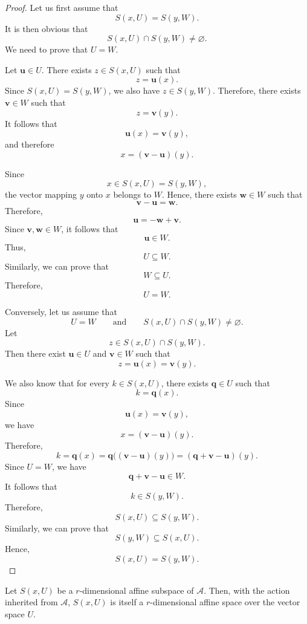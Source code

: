 \documentclass[12pt]{article}
\begin{document}
\begin{proof}
Let us first assume that
\[
S(x,U)=S(y,W).
\]
It is then obvious that
\[
S(x,U)\cap S(y,W)\neq\varnothing.
\]
We need to prove that \(U=W\).

Let \(\mathbf{u}\in U\). There exists \(z\in S(x,U)\) such that
\[
z=\mathbf{u}(x).
\]
Since \(S(x,U)=S(y,W)\), we also have \(z\in S(y,W)\). Therefore, there
exists \(\mathbf{v}\in W\) such that
\[
z=\mathbf{v}(y).
\]
It follows that
\[
\mathbf{u}(x)=\mathbf{v}(y),
\]
and therefore
\[
x=(\mathbf{v}-\mathbf{u})(y).
\]

Since
\[
x\in S(x,U)=S(y,W),
\]
the vector mapping \(y\) onto \(x\) belongs to \(W\). Hence, there exists
\(\mathbf{w}\in W\) such that
\[
\mathbf{v}-\mathbf{u}=\mathbf{w}.
\]
Therefore,
\[
\mathbf{u}=-\mathbf{w}+\mathbf{v}.
\]
Since \(\mathbf{v},\mathbf{w}\in W\), it follows that
\[
\mathbf{u}\in W.
\]
Thus,
\[
U\subseteq W.
\]
Similarly, we can prove that
\[
W\subseteq U.
\]
Therefore,
\[
U=W.
\]

Conversely, let us assume that
\[
U=W
\qquad\text{and}\qquad
S(x,U)\cap S(y,W)\neq\varnothing.
\]
Let
\[
z\in S(x,U)\cap S(y,W).
\]
Then there exist \(\mathbf{u}\in U\) and \(\mathbf{v}\in W\) such that
\[
z=\mathbf{u}(x)=\mathbf{v}(y).
\]

We also know that for every \(k\in S(x,U)\), there exists
\(\mathbf{q}\in U\) such that
\[
k=\mathbf{q}(x).
\]
Since
\[
\mathbf{u}(x)=\mathbf{v}(y),
\]
we have
\[
x=(\mathbf{v}-\mathbf{u})(y).
\]
Therefore,
\[
k
=
\mathbf{q}(x)
=
\mathbf{q}\bigl((\mathbf{v}-\mathbf{u})(y)\bigr)
=
(\mathbf{q}+\mathbf{v}-\mathbf{u})(y).
\]
Since \(U=W\), we have
\[
\mathbf{q}+\mathbf{v}-\mathbf{u}\in W.
\]
It follows that
\[
k\in S(y,W).
\]
Therefore,
\[
S(x,U)\subseteq S(y,W).
\]
Similarly, we can prove that
\[
S(y,W)\subseteq S(x,U).
\]
Hence,
\[
S(x,U)=S(y,W).
\]
\end{proof}
\begin{proposition}
Let \(S(x,U)\) be a \(r\)-dimensional affine subspace of \(\mathcal A\). Then,
with the action inherited from \(\mathcal A\), \(S(x,U)\) is itself a
\(r\)-dimensional affine space over the vector space \(U\).
\end{proposition}
\end{document}
